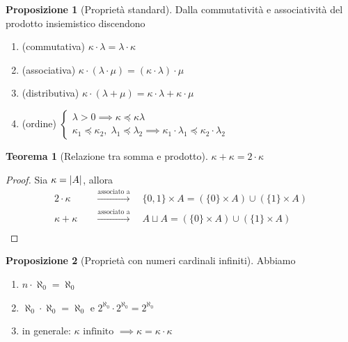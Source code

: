 \documentclass[a4paper,10pt]{article}
\theoremstyle{definition}
\theoremstyle{indentdefinition}
\theoremstyle{indentpostulate}
\theoremstyle{indenttheorem}
\newtheorem{thm}{Teorema}[section]
\newtheorem{prop}{Proposizione}[section]
\theoremstyle{myremark}
\theoremstyle{indentgeneral}
\newenvironment{myboxed} 
{\noindent\begin{lrbox}{\mybox}\begin{minipage}{\textwidth}}
{\end{minipage}\end{lrbox}\fbox{\usebox{\mybox}}}
\begin{document}
\begin{prop}[Proprietà standard]
    Dalla commutatività e associatività del prodotto insiemistico discendono
    \begin{enumerate}
        \item (commutativa) $\kappa\cdot\lambda=\lambda\cdot\kappa$
        \item (associativa) $\kappa\cdot(\lambda\cdot\mu)=(\kappa\cdot\lambda)\cdot\mu$
        \item (distributiva) $\kappa\cdot(\lambda+\mu)=\kappa\cdot\lambda+\kappa\cdot\mu$
        \item (ordine) $\begin{cases}
            \lambda>0\implies\kappa\preceq \kappa\lambda\\
            \kappa_1\preceq\kappa_2,\;\lambda_1\preceq\lambda_2\implies\kappa_1\cdot\lambda_1\preceq\kappa_2\cdot\lambda_2
        \end{cases}$
    \end{enumerate}
\end{prop}

\begin{thm}[Relazione tra somma e prodotto]
    $\kappa+\kappa=2\cdot \kappa$
\end{thm}

\begin{proof}
    Sia $\kappa=\abs{A}$, allora
    \begin{align*}
        2\cdot\kappa\quad &\overset{\text{associato a}}{\longrightarrow}\quad \{0,1\}\times A=(\{0\}\times A)\cup (\{1\}\times A) \\
         \kappa+\kappa\quad &\overset{\text{associato a}}{\longrightarrow} \quad A\sqcup A=(\{0\}\times A)\cup (\{1\}\times A) \\
    \end{align*}
\end{proof}

\begin{myboxed}
\begin{prop}[Proprietà con numeri cardinali infiniti]
    Abbiamo
    \begin{enumerate}
        \item $n\cdot\aleph_0=\aleph_0$
        \item $\aleph_0\cdot\aleph_0=\aleph_0$ e $2^{\aleph_0}\cdot2^{\aleph_0}=2^{\aleph_0}$
        \item in generale: $\boxed{\kappa\text{ infinito }\implies \kappa=\kappa\cdot\kappa}$
    \end{enumerate}
\end{prop}
\end{myboxed}
\end{document}
